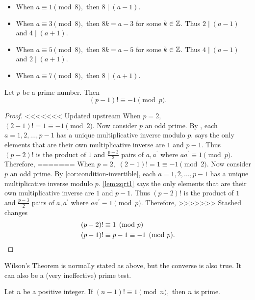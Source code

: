 \documentclass{ximera}
\begin{document}
\begin{pre}
\begin{remark}
    \begin{itemize}
        \item When $a\equiv 1\pmod 8,$ then $8\mid (a-1).$
        \item When $a\equiv 3\pmod 8,$ then $8k=a-3$ for some $k\in\mathbb Z.$ Thus $2\mid (a-1)$ and $4\mid (a+1)$.
        \item When $a\equiv 5\pmod 8,$ then $8k=a-5$ for some $k\in\mathbb Z.$ Thus $4\mid (a-1)$ and $2\mid (a+1)$.
        \item When $a\equiv 7\pmod 8,$ then $8\mid (a+1).$
    \end{itemize}
\end{remark}


\begin{theorem}\label{Wilson}
    Let $p$ be a prime number. Then \[(p-1)!\equiv -1\pmod{p}.\]
\end{theorem}

\begin{proof}
<<<<<<< Updated upstream
    When $p=2,$ $(2-1)!=1\equiv -1 \pmod{2}.$ Now consider $p$ an odd prime. By , each $a=1,2,\dots,p-1$ has a unique multiplicative inverse modulo $p.$  says the only elements that are their own multiplicative inverse are $1$ and $p-1$. Thus $(p-2)!$ is the product of $1$ and $\frac{p-3}{2}$ pairs of $a,a^\prime$ where $a a^\prime\equiv 1\pmod{p}.$ Therefore, 
=======
    When $p=2,$ $(2-1)!=1\equiv -1 \pmod{2}.$ Now consider $p$ an odd prime. By \cref{cor:condition-invertible}, each $a=1,2,\dots,p-1$ has a unique multiplicative inverse modulo $p.$ \cref{lem:sqrt1} says the only elements that are their own multiplicative inverse are $1$ and $p-1$. Thus $(p-2)!$ is the product of $1$ and $\frac{p-3}{2}$ pairs of $a,a^\prime$ where $a a^\prime\equiv 1\pmod{p}.$ Therefore, 
>>>>>>> Stashed changes
    \begin{align*}
        (p-2)! & \equiv 1\pmod{p}\\
        (p-1)! & \equiv p-1\equiv -1 \pmod{p}.\qedhere
    \end{align*}
\end{proof}

Wilson's Theorem is normally stated as above, but the converse is also true. It can also be a (very ineffective) prime test.
\begin{proposition}\label{Wilson-converse}
    Let $n$ be a positive integer. If $(n-1)!\equiv 1\pmod{n},$ then $n$ is prime.
\end{proposition}


\end{pre}
\end{document}
